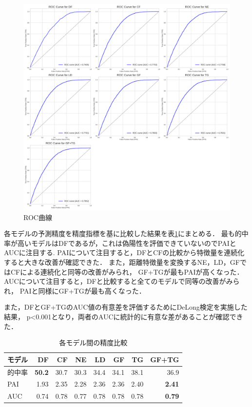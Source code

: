 \begin{figure}
  \centering %
  \includegraphics[scale=0.25]{./non-crime-no-timeseries-fig/roc_auc.png}
  \caption{ROC曲線}
  \label{fig:non-crime-no-timeseries-roc}
\end{figure}
各モデルの予測精度を精度指標を基に比較した結果を表\ref{tb:non-crime-no-timeseries-index}にまとめる．
最も的中率が高いモデルはDFであるが，これは偽陽性を評価できていないのでPAIとAUCに注目する.
PAIについて注目すると，DFとCFの比較から特徴量を連続化すると大きな改善が確認できた．
また，距離特徴量を変換するNE，LD，GFではCFによる連続化と同等の改善がみられ，
GF+TGが最もPAIが高くなった．
AUCについて注目すると，DFと比較すると全てのモデルで同等の改善がみられ，
PAIと同様にGF+TGが最も高くなった．

また，DFとGF+TGのAUC値の有意差を評価するためにDeLong検定\citep{DeLong}を実施した結果，
p<0.001となり，両者のAUCに統計的に有意な差があることが確認できた．

\begin{table}[htbp]
  \centering
  \caption{各モデル間の精度比較}
  \begin{tabular}{l|r||r|r|r|r|r|r}
  \hline

モデル & DF & CF & NE & LD & GF & TG & GF+TG \\  \hline\hline
的中率 & \bf{50.2} & 30.7 & 30.3 & 34.4 & 34.1 & 38.1 & 36.9 \\ 
PAI & 1.93 & 2.35 & 2.28 & 2.36 & 2.36 & 2.40 & \bf{2.41} \\ 
AUC & 0.74 & 0.78 & 0.77 & 0.78 & 0.78 & 0.78 & \bf{0.79} \\ \hline


  \end{tabular}
  \label{tb:non-crime-no-timeseries-index}
\end{table}

\FloatBarrier
